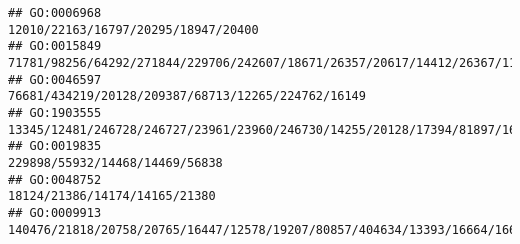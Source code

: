 \documentclass[
]{article}
\begin{document}
\begin{verbatim}
## GO:0006968                                                                                                                                                                                                                                                                                                                                                                          12010/22163/16797/20295/18947/20400
## GO:0015849                                                                                                                                                                                                                               71781/98256/64292/271844/229706/242607/18671/26357/20617/14412/26367/11833/11988/382044/104158/13897/102680/216225/16204/20500/18126/76408/50934/21943/69354/20519/24115/12780
## GO:0046597                                                                                                                                                                                                                                                                                                                                                           76681/434219/20128/209387/68713/12265/224762/16149
## GO:1903555                                                                                                                                                                                                                                                                                        13345/12481/246728/246727/23961/23960/246730/14255/20128/17394/81897/16160/20303/12775/110168/12475/60533/20371/12229
## GO:0019835                                                                                                                                                                                                                                                                                                                                                                               229898/55932/14468/14469/56838
## GO:0048752                                                                                                                                                                                                                                                                                                                                                                                18124/21386/14174/14165/21380
## GO:0009913                                                                                                                                                                                                                                                                 140476/21818/20758/20765/16447/12578/19207/80857/404634/13393/16664/16666/17702/22337/16688/16682/268885/433016/20861/100034684/20862/224796

\end{verbatim}
\end{document}
